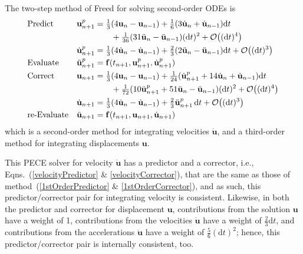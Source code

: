 The two-step method of Freed \cite{Freed17a} for solving second-order ODEs is
\begin{subequations}
    \label{pairedMethods}
    \begin{align}
    \mbox{} & \text{Predict} &
    \mathbf{u}_{n+1}^p & = \tfrac{1}{3} (
    4 \mathbf{u}_n - \mathbf{u}_{n-1} ) + 
    \tfrac{1}{6} ( 3 \dot{\mathbf{u}}_n + 
    \dot{\mathbf{u}}_{n-1} ) \mathrm{d}t \notag \\ 
    \mbox{} & & & \qquad + 
    \tfrac{1}{36} ( 31 \ddot{\mathbf{u}}_n - 
    \ddot{\mathbf{u}}_{n-1} ) (\mathrm{d}t)^2 + 
    \mathcal{O} \bigl( (\mathrm{d}t)^4 \bigr) 
    \label{displacementPredictor} \\
    \mbox{} & &
    \dot{\mathbf{u}}_{n+1}^p & = \tfrac{1}{3} 
    ( 4 \dot{\mathbf{u}}_n - \dot{\mathbf{u}}_{n-1} ) + 
    \tfrac{2}{3} ( 2\ddot{\mathbf{u}}_n - \ddot{\mathbf{u}}_{n-1} )
    \mathrm{d}t + \mathcal{O} \bigl( (\mathrm{d}t)^3 \bigr)
    \label{velocityPredictor} \\
    \mbox{} & \text{Evaluate} &
    \ddot{\mathbf{u}}^p_{n+1} & = \mathbf{f} (t_{n+1}, \mathbf{u}^p_{n+1}, \dot{\mathbf{u}}^p_{n+1}) 
    \label{2ndEvaluate} \\
    \mbox{} & \text{Correct} & 
    \mathbf{u}_{n+1} & = \tfrac{1}{3} (
    4  \mathbf{u}_n - \mathbf{u}_{n-1} ) +
    \tfrac{1}{24} ( \dot{\mathbf{u}}^p_{n+1} +
    14 \dot{\mathbf{u}}_n + \dot{\mathbf{u}}_{n-1} ) \mathrm{d}t 
    \notag \\
    \mbox{} & & & \qquad +
    \tfrac{1}{72} ( 10 \ddot{\mathbf{u}}^p_{n+1} + 
    51 \ddot{\mathbf{u}}_n - \ddot{\mathbf{u}}_{n-1} ) (\mathrm{d}t)^2 + 
    \mathcal{O} \bigl( (\mathrm{d}t)^4 \bigr)
    \label{displacementCorrector} \\ 
    \mbox{} & &
    \dot{\mathbf{u}}_{n+1} & = \tfrac{1}{3} 
    ( 4 \dot{\mathbf{u}}_n - \dot{\mathbf{u}}_{n-1} ) + 
    \tfrac{2}{3} \ddot{\mathbf{u}}^p_{n+1} \, \mathrm{d}t + 
    \mathcal{O} \bigl( (\mathrm{d}t)^3 \bigr)
    \label{velocityCorrector} \\
    \mbox{} & \text{re-Evaluate} & 
    \ddot{\mathbf{u}}_{n+1} & = \mathbf{f} (t_{n+1}, \mathbf{u}_{n+1}, \dot{\mathbf{u}}_{n+1})
    \label{2ndReEvaluate}
    \end{align}
\end{subequations}
which is a second-order method for integrating velocities $\dot{\mathbf{u}}$, and a third-order method for integrating displacements $\mathbf{u}$.  

This PECE solver for velocity $\dot{\mathbf{u}}$ has a predictor and a corrector, i.e., Eqns.~(\ref{velocityPredictor} \& \ref{velocityCorrector}), that are the same as those of method~(\ref{1stOrderPredictor} \& \ref{1stOrderCorrector}), and as such, this predictor\slash corrector pair for integrating velocity is consistent.  Likewise, in both the predictor and corrector for displacement $\mathbf{u}$, contributions from the solution $\mathbf{u}$ have a weight of 1, contributions from the velocities $\dot{\mathbf{u}}$ have a weight of $\tfrac{2}{3} \mathrm{d}t$, and contributions from the accelerations $\ddot{\mathbf{u}}$ have a weight of $\tfrac{5}{6} (\mathrm{d}t)^2$; hence, this predictor\slash corrector pair is internally consistent, too.


